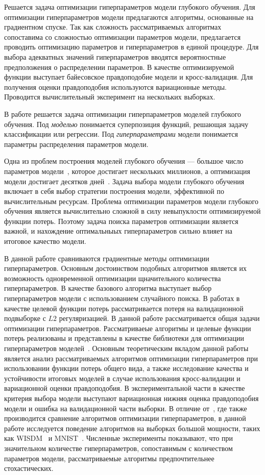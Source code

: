 Решается задача оптимизации гиперпараметров модели глубокого обучения. Для оптимизации гиперпараметров модели предлагаются алгоритмы, основанные на градиентном спуске. Так как сложность рассматриваемых алгоритмах сопоставима со сложностью оптимизации параметров модели, предлагается проводить оптимизацию параметров и гиперпараметров в единой процедуре. Для выбора адекватных значений гиперпараметров вводятся вероятностные предположения о распределении параметров. В качестве оптимизируемой функции выступает байесовское правдоподобие модели и кросс-валидация. Для получения оценки правдоподобия используются вариационные методы. Проводится вычислительный эксперимент на нескольких выборках.

В работе решается задача оптимизации гиперпараметров моделей глубокого обучения. Под \textit{моделью} понимается суперпозиция функций, решающая задачу классификации или регрессии. Под \textit{гиперпараметрами} модели понимается параметры распределения параметров модели. 

Одна из проблем построения моделей глубокого обучения --- большое число параметров модели~\cite{hinton_rbm}, которое достигает нескольких миллионов, а оптимизация модели достигает десятков дней~\cite{suts}. Задача выбора модели глубокого обучения включает в себя выбор стратегии построения модели, эффективной по вычислительным ресурсам. Проблема оптимизации параметров модели глубокого обучения является вычислительно сложной в силу невыпуклости оптимизируемой функции потерь. Поэтому задача поиска параметров оптимизации является важной, и нахождение оптимальныых гиперпараметров сильно влияет на итоговое качество модели. 

В данной работе сравниваются градиентные методы оптимизации гиперпараметров. Основным достоинством подобных алгоритмов является их возможность одновременной оптимизации щначительного количества гиперпараметров. В качестве базового алгоритма выступает выбор гиперпараметров модели с использованием случайного поиска.  В работах\cite{hyper_mad,hyper_hoag,greed_hyper} в качестве целевой функции потерь рассматривается потеря на валидационной подвыборке с $L2$ регуляризацией. В данной работе рассматривается общая задачи оптимизации гиперпараметров. Рассматриваеые алгоритмы и целевые функции потерь реализованы и представлены в качестве библиотеки для оптимизации гиперпараметров моделей~\cite{pyfos}. Основным теоретическим вкладом данной работы является анализ рассматриваемых алгоритмов оптимизации гиперпараметров при использовании функции потерь общего вида, а также исследование качества и устойчивости итоговых моделей в случае использования кросс-валидации и вариационной оценки правдоподобия.  В экспериментальной части в качестве критерия выбора модели выступают вариационная нижняя оценка правдоподобия модели и ошибка на валидационной части выборки. В отличие от~\cite{hyper_hoag}, где также производится сравнение алгоритмов оптимизации гиперпараметров, в данной работе исследуется поведение алгоритмов на выборках большой мощности, таких как WISDM~\cite{wisdm} и MNIST~\cite{mnist}.
Численные эксперименты показывают, что при значительном количестве гиперпараметров, сопоставимым с количеством параметров модели, рассматриваемые алгоритмы предпочтительнее стохастических. 

